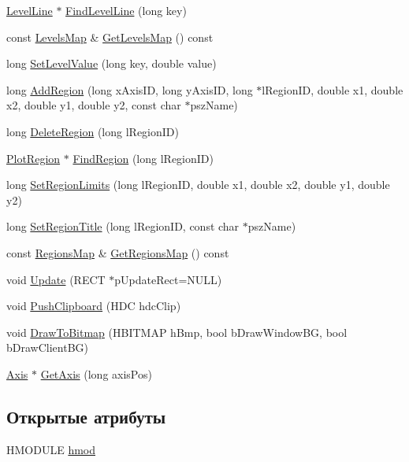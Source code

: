 \begin{DoxyCompactItemize}
\item 
\hyperlink{class_level_line}{Level\-Line} $\ast$ \hyperlink{class_x_y_plot_ad32ba41db0be82793ed40bf1841a1c58}{Find\-Level\-Line} (long key)
\item 
const \hyperlink{_level_line_8h_a3cdadb601712f2009c6ebd422232d17e}{Levels\-Map} \& \hyperlink{class_x_y_plot_a42a6bca54acc89a25eeae83e97fdcb28}{Get\-Levels\-Map} () const 
\item 
long \hyperlink{class_x_y_plot_af49b0904ab14c28aff05b5d25d89a084}{Set\-Level\-Value} (long key, double value)
\item 
long \hyperlink{class_x_y_plot_a541360f615950e2185796e943ed18c39}{Add\-Region} (long x\-Axis\-I\-D, long y\-Axis\-I\-D, long $\ast$l\-Region\-I\-D, double x1, double x2, double y1, double y2, const char $\ast$psz\-Name)
\item 
long \hyperlink{class_x_y_plot_a41ea6c678936e9a840e50666d1bce349}{Delete\-Region} (long l\-Region\-I\-D)
\item 
\hyperlink{class_plot_region}{Plot\-Region} $\ast$ \hyperlink{class_x_y_plot_a9d51a4bf4fddc2855271660238df3135}{Find\-Region} (long l\-Region\-I\-D)
\item 
long \hyperlink{class_x_y_plot_abcf82bb19c5bc4ab6f87b9406d7e4855}{Set\-Region\-Limits} (long l\-Region\-I\-D, double x1, double x2, double y1, double y2)
\item 
long \hyperlink{class_x_y_plot_ad57e75d825c882944d5765835dd07e23}{Set\-Region\-Title} (long l\-Region\-I\-D, const char $\ast$psz\-Name)
\item 
const \hyperlink{_regions_8h_a75ca559f3ba2ddf617b9c211afcdd941}{Regions\-Map} \& \hyperlink{class_x_y_plot_aa8ed3c9f80774993b1cdc80170c0963f}{Get\-Regions\-Map} () const 
\item 
void \hyperlink{class_x_y_plot_a7b926c9c2e2b37546082ab9959af6107}{Update} (R\-E\-C\-T $\ast$p\-Update\-Rect=N\-U\-L\-L)
\item 
void \hyperlink{class_x_y_plot_ac7aa886bd9d07f0905e518f647cdce1a}{Push\-Clipboard} (H\-D\-C hdc\-Clip)
\item 
void \hyperlink{class_x_y_plot_acff15932fbb85dd496ff314f67432bb3}{Draw\-To\-Bitmap} (H\-B\-I\-T\-M\-A\-P h\-Bmp, bool b\-Draw\-Window\-B\-G, bool b\-Draw\-Client\-B\-G)
\item 
\hyperlink{class_axis}{Axis} $\ast$ \hyperlink{class_x_y_plot_a68cf37a9f84f72c24e99c734ef3bffab}{Get\-Axis} (long axis\-Pos)
\end{DoxyCompactItemize}
\subsection*{Открытые атрибуты}
\begin{DoxyCompactItemize}
\item 
H\-M\-O\-D\-U\-L\-E \hyperlink{class_x_y_plot_ab15afb29a18084d99ed04dc3a7485326}{hmod}
\end{DoxyCompactItemize}
